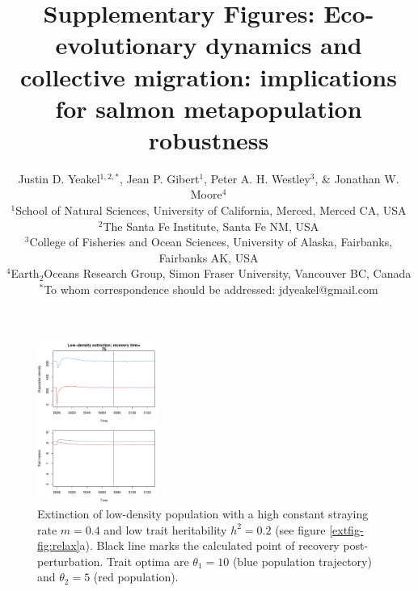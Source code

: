 \documentclass{revtex4}
\newcommand{\beginsupplement}{%
        \clearpage
        \setcounter{table}{0}
        \renewcommand{\thetable}{S\arabic{table}}%
        \setcounter{figure}{0}
        \renewcommand{\thefigure}{S\arabic{figure}}%
     }
\begin{document}
\title{Supplementary Figures: Eco-evolutionary dynamics and collective migration: implications for salmon metapopulation robustness}
\author{
Justin D. Yeakel${}^{1,2,*}$, Jean P. Gibert${}^{1}$, Peter A. H. Westley${}^{3}$, \& Jonathan W. Moore${}^{4}$ \\
${}^1$School of Natural Sciences, University of California, Merced, Merced CA, USA \\
${}^2$The Santa Fe Institute, Santa Fe NM, USA \\
${}^3$College of Fisheries and Ocean Sciences, University of Alaska, Fairbanks, Fairbanks AK, USA \\
${}^4$Earth${}_2$Oceans Research Group, Simon Fraser University, Vancouver BC, Canada \\
${}^*$To whom correspondence should be addressed: jdyeakel@gmail.com
}

\maketitle

\beginsupplement

\begin{figure}
  \captionsetup{justification=raggedright,
singlelinecheck=false
}
\centering
\includegraphics[width=0.35\textwidth]{figs2/fig_relax_small.pdf}
\caption{
Extinction of low-density population with a high constant straying rate $m=0.4$ and low trait heritability $h^2=0.2$ (see figure \ref{extfig-fig:relax}a).
Black line marks the calculated point of recovery post-perturbation.
Trait optima are $\theta_1 = 10$ (blue population trajectory) and $\theta_2 = 5$ (red population).
} \label{fig:relaxtraj_ldlh}
\end{figure}
\end{document}
